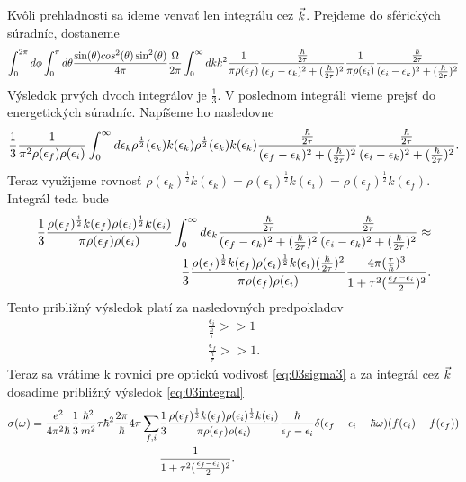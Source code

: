  Kvôli prehladnosti sa ideme venvať len integrálu cez $\vec{k}$. Prejdeme do sférických súradníc, dostaneme
\begin{align}
\int_0^{2\pi}d\phi\int_0^\pi d\theta \frac{\sin(\theta)cos^2(\theta)\sin^2(\theta)}{4\pi} \frac{\Omega}{2\pi} \int_0^\infty dk k^2 \frac{1}{\pi\rho(\epsilon_f)}\frac{\frac{\hbar}{2\tau}}{(\epsilon_f-\epsilon_{k})^2+(\frac{\hbar}{2\tau})^2} \frac{1}{\pi\rho(\epsilon_i)}\frac{\frac{\hbar}{2\tau}}{(\epsilon_i-\epsilon_{k})^2+(\frac{\hbar}{2\tau})^2} 
\end{align}
Výsledok prvých dvoch integrálov je $\frac{1}{3}$. V poslednom integráli vieme prejsť do energetických súradníc. Napíšeme ho nasledovne
\begin{align}
\frac{1}{3}\frac{1}{\pi^2\rho(\epsilon_f)\rho(\epsilon_i)}\int_0^\infty d\epsilon_k \rho^{\frac{1}{2}}(\epsilon_k)k(\epsilon_k)\rho^{\frac{1}{2}}(\epsilon_k)k(\epsilon_k)\frac{\frac{\hbar}{2\tau}}{(\epsilon_f-\epsilon_{k})^2+(\frac{\hbar}{2\tau})^2}\frac{\frac{\hbar}{2\tau}}{(\epsilon_i-\epsilon_{k})^2+(\frac{\hbar}{2\tau})^2}\text{.}
\end{align}
Teraz využijeme rovnosť $\rho(\epsilon_k)^{\frac{1}{2}}k(\epsilon_k)=\rho(\epsilon_i)^{\frac{1}{2}}k(\epsilon_i)=\rho(\epsilon_f)^{\frac{1}{2}}k(\epsilon_f)$. Integrál teda bude
\begin{align}
\label{eq:03integral}
\frac{1}{3}\frac{\rho(\epsilon_f)^{\frac{1}{2}}k(\epsilon_f)\rho(\epsilon_i)^{\frac{1}{2}}k(\epsilon_i)}{\pi\rho(\epsilon_f)\rho(\epsilon_i)}\int_0^\infty d\epsilon_k\frac{\frac{\hbar}{2\tau}}{(\epsilon_f-\epsilon_{k})^2+(\frac{\hbar}{2\tau})^2}\frac{\frac{\hbar}{2\tau}}{(\epsilon_i-\epsilon_{k})^2+(\frac{\hbar}{2\tau})^2}\approx\\ \notag
\frac{1}{3}\frac{\rho(\epsilon_f)^{\frac{1}{2}}k(\epsilon_f)\rho(\epsilon_i)^{\frac{1}{2}}k(\epsilon_i)(\frac{\hbar}{2\tau})^2}{\pi\rho(\epsilon_f)\rho(\epsilon_i)}\frac{4\pi(\frac{\tau}{\hbar})^3}{1+\tau^2(\frac{\epsilon_f-\epsilon_i}{2})^2}\text{.}
\end{align}
Tento približný výsledok platí za nasledovných predpokladov
\begin{align}
\label{eq:03cond1}
\frac{\epsilon_i}{\frac{\hbar}{\tau}} >> 1\\
\label{eq:03cond2}
\frac{\epsilon_f}{\frac{\hbar}{\tau}} >> 1\text{.}
\end{align}
Teraz sa vrátime k rovnici pre optickú vodivosť \eqref{eq:03sigma3} a za integrál cez $\vec{k}$ dosadíme približný výsledok \eqref{eq:03integral}
\begin{align}
\sigma(\omega)=\frac{e^2}{4\pi^2\hbar}\frac{1}{3}\frac{\hbar^2}{m^2}\tau\hbar^2\frac{2\pi}{\hbar}4\pi\sum_{f,i}&\frac{1}{3}\frac{\rho(\epsilon_f)^{\frac{1}{2}}k(\epsilon_f)\rho(\epsilon_i)^{\frac{1}{2}}k(\epsilon_i)}{\pi\rho(\epsilon_f)\rho(\epsilon_i)}\frac{\hbar}{\epsilon_f-\epsilon_i}\delta(\epsilon_f-\epsilon_i-\hbar\omega)(f(\epsilon_i)-f(\epsilon_f))\\ \notag
&\frac{1}{1+\tau^2(\frac{\epsilon_f-\epsilon_i}{2})^2}
\text{.}
\end{align}

